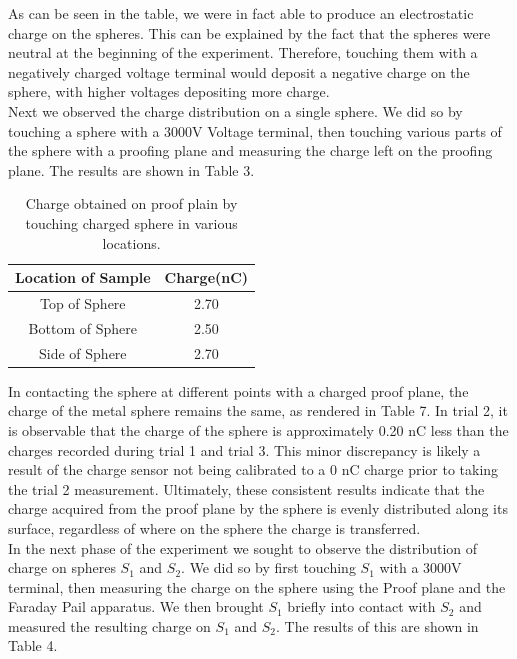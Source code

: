 \documentclass[oneside,12pt]{amsart}
\begin{document}
\indent As can be seen in the table, we were in fact able to produce an electrostatic charge on the spheres. This can be explained by the fact that the spheres were neutral at the beginning of the experiment. Therefore, touching them with a negatively charged voltage terminal would deposit a negative charge on the sphere, with higher voltages depositing more charge.\\

\indent Next we observed the charge distribution on a single sphere. We did so by touching a sphere with a 3000V Voltage terminal, then touching various parts of the sphere with a proofing plane and measuring the charge left on the proofing plane. The results are shown in Table 3.

\begin{table}[H]
	\begin{tabular}{ |c|c|}
		\hline
		Location of Sample & Charge(nC)\\
		\hline
		Top of Sphere&2.70\\
		Bottom of Sphere&2.50\\
		Side of Sphere&2.70\\
		\hline	
	\end{tabular}
	\caption{Charge obtained on proof plain by touching charged sphere in various locations.}
\end{table}

\indent In contacting the sphere at different points with a charged proof plane, the charge of the metal sphere remains the same, as rendered in Table 7. In trial 2, it is observable that the charge of the sphere is approximately 0.20 nC less than the charges recorded during trial 1 and trial 3. This minor discrepancy is likely a result of the charge sensor not being calibrated to a 0 nC charge prior to taking the trial 2 measurement. Ultimately, these consistent results indicate that the charge acquired from the proof plane by the sphere is evenly distributed along its surface, regardless of where on the sphere the charge is transferred. \\

\indent In  the next phase of the experiment we sought to observe the distribution of charge on spheres $S_1$ and $S_2$. We did so by first touching $S_1$ with a 3000V terminal, then measuring the charge on the sphere using the Proof plane and the Faraday Pail apparatus. We then brought $S_1$ briefly into contact with $S_2$ and measured the resulting charge on $S_1$ and $S_2$. The results of this are shown in Table 4.\\
\end{document}
